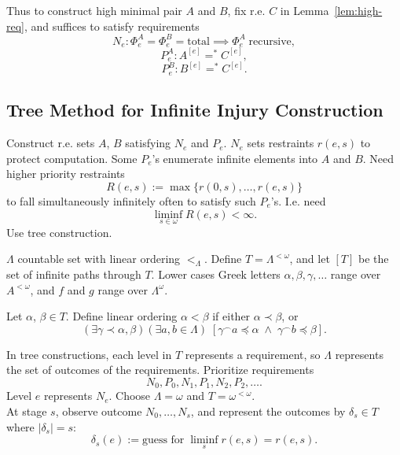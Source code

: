   Thus to construct high minimal pair $A$ and $B$, fix r.e. $C$ in
  Lemma~\ref{lem:high-req}, and suffices to satisfy requirements
  \[N_e: \Phi_e^A=\Phi_e^B=\text{total} \implies \Phi_e^A\;
  \text{recursive},\]
  \[P_e^A: A^{[e]} =^* C^{[e]},\]
  \[P_e^B: B^{[e]} =^* C^{[e]}.\]

\subsection{Tree Method for Infinite Injury Construction}
  \label{section:infinite-injury}
  Construct r.e. sets $A$, $B$ satisfying $N_e$ and $P_e$.  $N_e$ sets
  restraints $r(e,s)$ to protect computation. Some $P_e$'s enumerate
  infinite elements into $A$ and $B$. Need higher priority restraints
  \[R(e,s) := \max\{r(0,s),\ldots,r(e,s)\}\]
  to fall simultaneously infinitely often to satisfy such $P_e$'s. I.e.
  need
  \begin{equation}
    \liminf_{s\in\omega} R(e,s) <\infty.
    \label{eqn:liminf}
  \end{equation}
  Use tree construction.

  \begin{definition}
    $\Lambda$ countable set with linear ordering $<_\Lambda$. Define
    $T=\Lambda^{<\omega}$, and let $[T]$ be the set of infinite paths
    through $T$. Lower cases Greek letters $\alpha,\beta,\gamma,\ldots$
    range over $A^{<\omega}$, and $f$ and $g$ range over $\Lambda^\omega$.
  \end{definition}

  \begin{definition}
    Let $\alpha$, $\beta\in T$. Define linear ordering $\alpha<\beta$
    if either $\alpha \prec \beta$, or
    \[(\exists \gamma \prec \alpha, \beta) (\exists a,b \in \Lambda)\;
    [\gamma^\frown a \preceq\alpha\; \wedge\; \gamma^\frown b
    \preceq\beta].\]
  \end{definition}

  In tree constructions, each level in $T$ represents a requirement, so
  $\Lambda$ represents the set of outcomes of the requirements. Prioritize
  requirements
  \[N_0, P_0, N_1, P_1, N_2, P_2, \ldots.\]
  Level $e$ represents $N_e$. Choose $\Lambda=\omega$ and
  $T=\omega^{<\omega}$. \\

  At stage $s$, observe outcome $N_0,\ldots,N_s$, and represent the
  outcomes by $\delta_s\in T$ where $|\delta_s|=s$:
  \[\delta_s(e) :=\text{guess for}\; \liminf_s r(e,s) =r(e,s).\]
  
